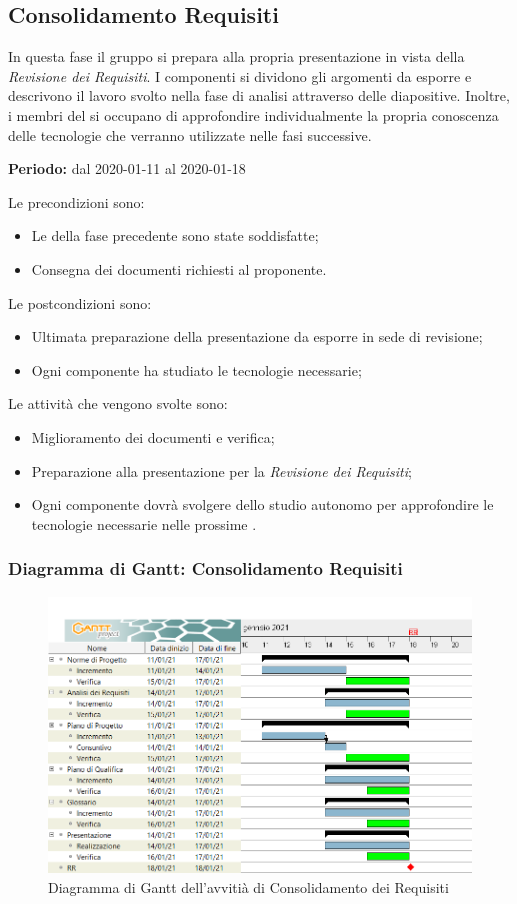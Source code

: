 \subsection{Consolidamento Requisiti}
\label{consolidamento_requisiti}
In questa fase il gruppo si prepara alla propria presentazione in vista della \textit{Revisione dei Requisiti}.
I componenti si dividono gli argomenti da esporre e descrivono il lavoro svolto nella fase di analisi attraverso delle diapositive.
Inoltre, i membri del  si occupano di approfondire individualmente la propria conoscenza delle tecnologie che verranno utilizzate nelle fasi successive.

\textbf{Periodo:} dal 2020-01-11 al 2020-01-18

Le precondizioni sono:
\begin{itemize}
    \item Le  della fase precedente sono state soddisfatte;
    \item Consegna dei documenti richiesti al proponente.
\end{itemize}
Le postcondizioni sono:
\begin{itemize}
    \item Ultimata preparazione della presentazione da esporre in sede di revisione;
    \item Ogni componente ha studiato le tecnologie necessarie;
\end{itemize}
	
Le attività che vengono svolte sono:
\begin{itemize}
    \item Miglioramento dei documenti e verifica;
    \item Preparazione alla presentazione per la \textit{Revisione dei Requisiti};
    \item Ogni componente dovrà svolgere dello studio autonomo per approfondire le tecnologie necessarie nelle prossime .  
\end{itemize}

\newpage
\subsubsection{Diagramma di Gantt: Consolidamento Requisiti}
\begin{figure}[ht]
    \centering
    \includegraphics[width=\textwidth]{../../Immagini/GanttConsolidamentoRequisiti}
    \caption{Diagramma di Gantt dell'avvitià di Consolidamento dei Requisiti}
\end{figure}
